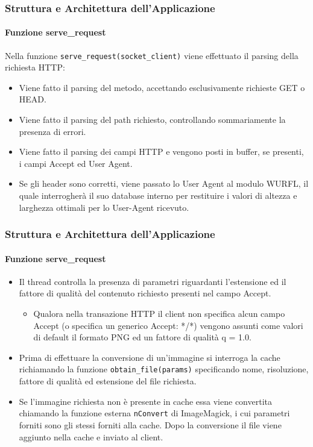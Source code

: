 \documentclass{beamer}
\begin{document}
\begin{frame}
\frametitle{Struttura e Architettura dell'Applicazione}
\framesubtitle{Funzione serve\_request}

Nella funzione \texttt{serve\_request(socket\_client)} viene effettuato il parsing della richiesta HTTP:

\begin{itemize}
\item Viene fatto il parsing del metodo, accettando esclusivamente richieste GET o HEAD.
\item Viene fatto il parsing del path richiesto, controllando sommariamente la presenza di errori.
\item Viene fatto il parsing dei campi HTTP e vengono posti in buffer, se presenti, i campi Accept ed User Agent.
\item Se gli header sono corretti, viene passato lo User Agent al modulo
WURFL, il quale interrogherà il suo database interno per restituire i
valori di altezza e larghezza ottimali per lo User-Agent ricevuto.
\end{itemize}

\end{frame}


\begin{frame}
\frametitle{Struttura e Architettura dell'Applicazione}
\framesubtitle{Funzione serve\_request}


\begin{itemize}
\item Il thread controlla la presenza di parametri riguardanti l’estensione ed il
fattore di qualità del contenuto richiesto presenti nel campo Accept.
\begin{itemize}
\item Qualora nella transazione HTTP il client non specifica alcun campo
Accept (o specifica un generico Accept: */*) vengono assunti come
valori di default il formato PNG ed un fattore di qualità q = 1.0.
\end{itemize}
\item Prima di effettuare la conversione di un’immagine si interroga la cache
richiamando la funzione \texttt{obtain\_file(params)} specificando nome,
risoluzione, fattore di qualità ed estensione del file richiesta.
\item Se l’immagine richiesta non è presente in cache essa viene convertita
chiamando la funzione esterna \texttt{nConvert} di ImageMagick, i cui parametri
forniti sono gli stessi forniti alla cache. Dopo la conversione il file viene
aggiunto nella cache e inviato al client.
\end{itemize}

\end{frame}
\end{document}
